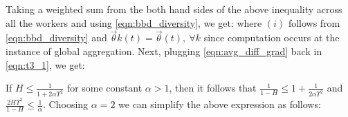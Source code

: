 Taking a weighted sum from the both hand sides of the above inequality across all the workers and using \eqref{eqn:bbd_diversity}, we get:
where $(i)$ follows from \eqref{eqn:bbd_diversity} and $\vec{\theta}{k}{(t)}=\vec{\theta}{}{(t)},~\forall k$ since computation occurs at the instance of global aggregation.
Next, plugging \eqref{eqn:avg_diff_grad} back in \eqref{eqn:t3_1}, we get:

If $H \leq \frac{1}{1+2\alpha\Upsilon^2}$ for some constant $\alpha > 1$, then it follows that $\frac{1}{1-H} \leq 1+ \frac{1}{2\alpha\Upsilon^2}$ and $\frac{2H\Upsilon^2}{1-H} \leq \frac{1}{\alpha}$. Choosing $\alpha = 2$ we can simplify the above expression as follows:

